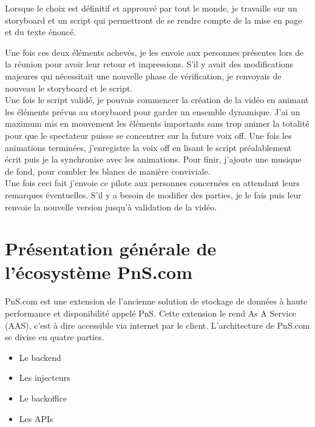 Lorsque le choix est définitif et approuvé par tout le monde, je travaille sur un storyboard et un script qui permettront de se rendre compte de la mise en page et du texte énoncé. 


Une fois ces deux éléments achevés, je les envoie aux personnes présentes lors de la réunion pour avoir leur retour et impressions. S'il y avait des modifications majeures qui nécessitait une nouvelle phase de vérification, je renvoyais de nouveau le storyboard et le script.\\


Une fois le script validé, je pouvais commencer la création de la vidéo en animant les éléments prévus au storybaord pour garder un ensemble dynamique. J'ai un maximum mis en mouvement les éléments importants sans trop animer la totalité pour que le spectateur puisse se concentrer sur la future voix off. Une fois les animations terminées, j'enregistre la voix off en lisant le script préalablement écrit puis je la synchronise avec les animations. Pour finir, j'ajoute une musique de fond, pour combler les blancs de manière conviviale.\\

Une fois ceci fait j'envoie ce pilote aux personnes concernées en attendant leurs remarques éventuelles. S'il y a besoin de modifier des parties, je le fais puis leur renvoie la nouvelle version jusqu'à validation de la vidéo.



\section{Présentation générale de l'écosystème PnS.com}


PnS.com est une extension de l'ancienne solution de stockage de données à haute performance et disponibilité appelé PnS. Cette extension le rend As A Service (AAS), c'est à dire accessible via internet par le client. L'architecture de PnS.com se divise en quatre parties.

\begin{itemize}
    \item Le backend
    \item Les injecteurs
    \item Le backoffice
    \item Les APIs
\end{itemize}

